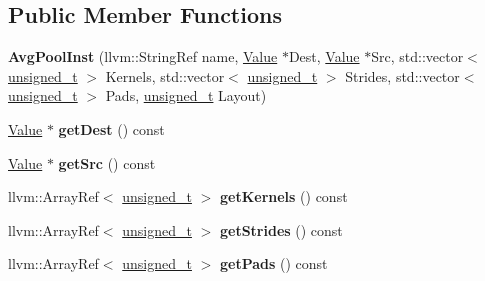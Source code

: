 \subsection*{Public Member Functions}
\begin{DoxyCompactItemize}
\item 
\mbox{\label{classglow_1_1_avg_pool_inst_aa0b6aa8628ff78b00e19f2d0f8db5a90}} 
{\bfseries Avg\+Pool\+Inst} (llvm\+::\+String\+Ref name, \hyperlink{classglow_1_1_value}{Value} $\ast$Dest, \hyperlink{classglow_1_1_value}{Value} $\ast$Src, std\+::vector$<$ \hyperlink{namespaceglow_a0ca574644e1e42ef193a9947fb4d8911}{unsigned\+\_\+t} $>$ Kernels, std\+::vector$<$ \hyperlink{namespaceglow_a0ca574644e1e42ef193a9947fb4d8911}{unsigned\+\_\+t} $>$ Strides, std\+::vector$<$ \hyperlink{namespaceglow_a0ca574644e1e42ef193a9947fb4d8911}{unsigned\+\_\+t} $>$ Pads, \hyperlink{namespaceglow_a0ca574644e1e42ef193a9947fb4d8911}{unsigned\+\_\+t} Layout)
\item 
\mbox{\label{classglow_1_1_avg_pool_inst_a336857b4601af30762044924f0a7a034}} 
\hyperlink{classglow_1_1_value}{Value} $\ast$ {\bfseries get\+Dest} () const
\item 
\mbox{\label{classglow_1_1_avg_pool_inst_abab2974004d3293d6d784e27a7f866e2}} 
\hyperlink{classglow_1_1_value}{Value} $\ast$ {\bfseries get\+Src} () const
\item 
\mbox{\label{classglow_1_1_avg_pool_inst_a467d10371263f213783ca74274e0d1c8}} 
llvm\+::\+Array\+Ref$<$ \hyperlink{namespaceglow_a0ca574644e1e42ef193a9947fb4d8911}{unsigned\+\_\+t} $>$ {\bfseries get\+Kernels} () const
\item 
\mbox{\label{classglow_1_1_avg_pool_inst_a219d685923fbf1169fbb4f4c07e4f7ef}} 
llvm\+::\+Array\+Ref$<$ \hyperlink{namespaceglow_a0ca574644e1e42ef193a9947fb4d8911}{unsigned\+\_\+t} $>$ {\bfseries get\+Strides} () const
\item 
\mbox{\label{classglow_1_1_avg_pool_inst_a0fecacfa961f4a116fe1fe552e55985a}} 
llvm\+::\+Array\+Ref$<$ \hyperlink{namespaceglow_a0ca574644e1e42ef193a9947fb4d8911}{unsigned\+\_\+t} $>$ {\bfseries get\+Pads} () const
\item 

\end{DoxyCompactItemize}
